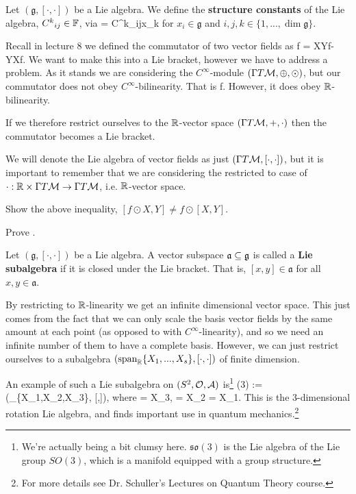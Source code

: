    Let $(\mathfrak{g},[\cdot,\cdot])$ be a Lie algebra. We define the \textbf{structure constants} of the Lie algebra, ${C^k}_{ij}\in\mathbb{F}$, via 
    \bse 
        [x_i,x_j] = {C^k}_{ij}x_k
    \ese 
    for $x_i\in\mathfrak{g}$ and $i,j,k\in\{1,...,\dim\mathfrak{g}\}$.
\ed 

Recall in lecture 8 we defined the commutator of two vector fields as 
\bse 
    [X,Y]\la f \ra = X\big\la Y\la f\ra \big\ra - Y\big\la X\la f\ra \big\ra. 
\ese 
We want to make this into a Lie bracket, however we have to address a problem. As it stands we are considering the $C^{\infty}$-module $(\Gamma T\mathcal{M},\oplus,\odot)$, but our commutator does not obey $C^{\infty}$-bilinearity. That is 
\bse 
    [f\odot X,Y] \neq f\odot [X,Y].
\ese 
However, it does obey $\mathbb{R}$-bilinearity. 

\bp 
\label{prop:LieAlgebraVectorFields}
    If we therefore restrict ourselves to the $\mathbb{R}$-vector space $(\Gamma T\mathcal{M},+,\cdot)$ then the commutator becomes a Lie bracket. 
\ep 

\bnn 
    We will denote the Lie algebra of vector fields as just $(\Gamma T\mathcal{M},[\cdot,\cdot])$, but it is important to remember that we are considering the restricted to case of $\cdot:\mathbb{R}\times\Gamma T\mathcal{M} \to \Gamma T\mathcal{M}$, i.e. $\mathbb{R}$-vector space.
\enn 

\bbox 
    \ben[label=(\alph*)]
    \item Show the above inequality, $[f\odot X,Y] \neq f\odot [X,Y]$.
    \item Prove .
    \een 
\ebox 

    Let $(\mathfrak{g}, [\cdot,\cdot])$ be a Lie algebra. A vector subspace $\mathfrak{a}\subseteq\mathfrak{g}$ is called a \textbf{Lie subalgebra} if it is closed under the Lie bracket. That is, $[x,y]\in\mathfrak{a}$ for all $x,y\in\mathfrak{a}$. 
\ed 

By restricting to $\mathbb{R}$-linearity we get an infinite dimensional vector space. This just comes from the fact that we can only scale the basis vector fields by the same amount at each point (as opposed to with $C^{\infty}$-linearity), and so we need an infinite number of them to have a complete basis. However, we can just restrict ourselves to a subalgebra $(\text{span}_{\mathbb{R}}\{X_1,...,X_s\},[\cdot,\cdot])$ of finite dimension. 

\bex 
    An example of such a Lie subalgebra on $(S^2,\mathcal{O},\mathcal{A})$ is\footnote{We're actually being a bit clumsy here. $\mathfrak{so}(3)$ is the Lie algebra of the Lie group $SO(3)$, which is a manifold equipped with a group structure.}
    \bse 
        (3) := (\Span_{\R}\{X_1,X_2,X_3\}, [\cdot,\cdot]),
    \ese
    where 
    \bse 
        [X_1,X_2] = X_3, \qquad [X_3,X_1] = X_2 \qand [X_2,X_3] = X_1.
    \ese 
    This is the 3-dimensional rotation Lie algebra, and finds important use in quantum mechanics.\footnote{For more details see Dr. Schuller's Lectures on Quantum Theory course.}
\eex 

